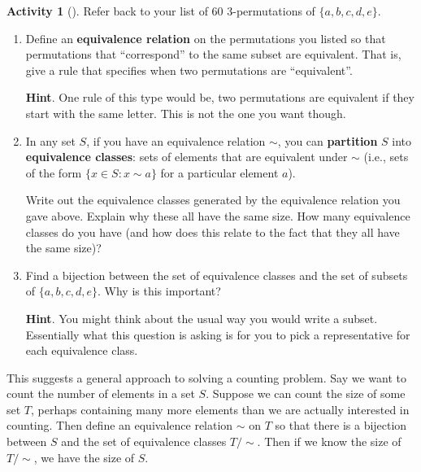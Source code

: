 \documentclass[10pt,]{book}
\newcommand{\terminology}[1]{\textbf{#1}}
\theoremstyle{plain}
\theoremstyle{definition}
\theoremstyle{definition}
\theoremstyle{definition}
\newtheorem{activity}[project]{Activity}
\numberwithin{equation}{chapter}
\def\st{:}
\begin{document}
\begin{activity}[]\label{activity-102}
\hypertarget{p-751}{}%
Refer back to your list of 60 3-permutations of \(\{a,b,c,d,e\}\).%
\begin{enumerate}[font=\bfseries,label=(\alph*),ref=\alph*]
\item\label{task-142} \hypertarget{p-752}{}%
Define an \terminology{equivalence relation} on the permutations you listed so that permutations that ``correspond'' to the same subset are equivalent.  That is, give a rule that specifies when two permutations are ``equivalent''.%
\par\smallskip%
\noindent\textbf{Hint}.\hypertarget{hint-61}{}\quad%
\hypertarget{p-753}{}%
One rule of this type would be, two permutations are equivalent if they start with the same letter.  This is not the one you want though.%
\item\label{task-143} \hypertarget{p-754}{}%
In any set \(S\), if you have an equivalence relation \(\sim\), you can \terminology{partition} \(S\) into \terminology{equivalence classes}: sets of elements that are equivalent under \(\sim\) (i.e., sets of the form \(\{x \in S \st x \sim a\} \) for a particular element \(a\)).%
\par
\hypertarget{p-755}{}%
Write out the equivalence classes generated by the equivalence relation you gave above.  Explain why these all have the same size.  How many equivalence classes do you have (and how does this relate to the fact that they all have the same size)?%
\item\label{task-144} \hypertarget{p-756}{}%
Find a bijection between the set of equivalence classes and the set of subsets of \(\{a,b,c,d,e\}\).  Why is this important?%
\par\smallskip%
\noindent\textbf{Hint}.\hypertarget{hint-62}{}\quad%
\hypertarget{p-757}{}%
You might think about the usual way you would write a subset.  Essentially what this question is asking is for you to pick a representative for each equivalence class.%
\end{enumerate}
\end{activity}
\hypertarget{p-758}{}%
This suggests a general approach to solving a counting problem.  Say we want to count the number of elements in a set \(S\).  Suppose we can count the size of some set \(T\), perhaps containing many more elements than we are actually interested in counting.  Then define an equivalence relation \(\sim\) on \(T\) so that there is a bijection between \(S\) and the set of equivalence classes \(T/\sim\).  Then if we know the size of \(T/\sim\), we have the size of \(S\).%
\end{document}
